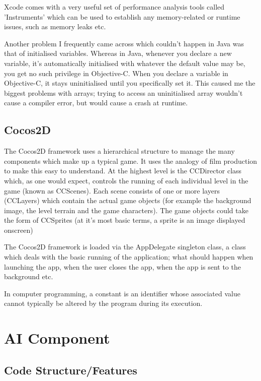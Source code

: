 \documentclass[a4paper,oneside]{report}
\begin{document}
Xcode comes with a very useful set of performance analysis tools called 'Instruments' which can be used to establish any memory-related or runtime issues, such as memory leaks etc.

Another problem I frequently came across which couldn't happen in Java was that of initialised variables. Whereas in Java, whenever you declare a new variable, it's automatically initialised with whatever the default value may be, you get no such privilege in Objective-C. When you declare a variable in Objective-C, it stays uninitialised until you specifically set it. This caused me the biggest problems with arrays; trying to access an uninitialised array wouldn't cause a compiler error, but would cause a crash at runtime.

\section{Cocos2D} 

The Cocos2D framework uses a hierarchical structure to manage the many components which make up a typical game. It uses the analogy of film production to make this easy to understand. At the highest level is the CCDirector class which, as one would expect, controls the running of each individual level in the game (known as CCScenes). Each scene consists of one or more  layers (CCLayers) which contain the actual game objects (for example the background image, the level terrain and the game characters). The game objects could take the form of CCSprites (at it's most basic terms, a sprite is an image displayed onscreen)

The Cocos2D framework is loaded via the AppDelegate singleton class, a class which deals with the basic running of the application; what should happen when launching the app, when the user closes the app, when the app is sent to the background etc.

In computer programming, a constant is an identifier whose associated value cannot typically be altered by the program during its execution.

\chapter{AI Component}

\section{Code Structure/Features}
\end{document}
